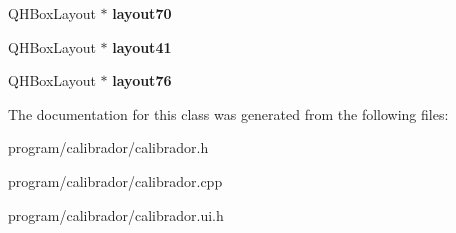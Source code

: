 \begin{DoxyCompactItemize}
\item 
Q\+H\+Box\+Layout $\ast$ {\bfseries layout70}\hypertarget{classcalibrador_a32637e02ec53f4c4bd6040cfef8a3214}{}\label{classcalibrador_a32637e02ec53f4c4bd6040cfef8a3214}

\item 
Q\+H\+Box\+Layout $\ast$ {\bfseries layout41}\hypertarget{classcalibrador_ae43c7a6de1ab654de1b1080a2d57090c}{}\label{classcalibrador_ae43c7a6de1ab654de1b1080a2d57090c}

\item 
Q\+H\+Box\+Layout $\ast$ {\bfseries layout76}\hypertarget{classcalibrador_a34544680c7dc314832e81cc61b86093b}{}\label{classcalibrador_a34544680c7dc314832e81cc61b86093b}

\end{DoxyCompactItemize}


The documentation for this class was generated from the following files\+:\begin{DoxyCompactItemize}
\item 
program/calibrador/calibrador.\+h\item 
program/calibrador/calibrador.\+cpp\item 
program/calibrador/calibrador.\+ui.\+h\end{DoxyCompactItemize}
